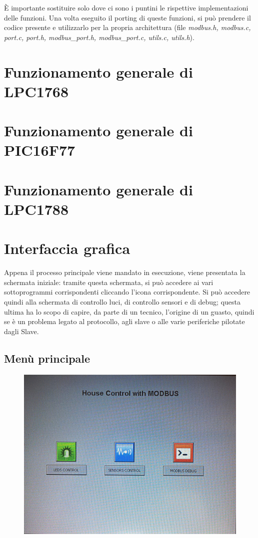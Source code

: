 \documentclass[a4paper,titlepage]{book}
\begin{document}
È importante sostituire solo dove ci sono i puntini le rispettive implementazioni delle funzioni. Una volta eseguito il porting di queste funzioni, si può prendere il codice presente e utilizzarlo per la propria architettura (file \textit{modbus.h, modbus.c, port.c, port.h, modbus\_port.h, modbus\_port.c, utils.c, utils.h}).


\section{Funzionamento generale di LPC1768}


\section{Funzionamento generale di PIC16F77}


\section{Funzionamento generale di LPC1788}

\section{Interfaccia grafica}

Appena il processo principale viene mandato in esecuzione, viene presentata la schermata iniziale: tramite questa schermata, si può accedere ai vari sottoprogrammi corrispondenti cliccando l'icona corrispondente. Si può accedere quindi alla schermata di controllo luci, di controllo sensori e di debug; questa ultima ha lo scopo di capire, da parte di un tecnico, l'origine di un guasto, quindi se è un problema legato al protocollo, agli slave o alle varie periferiche pilotate dagli Slave. 

\subsection{Menù principale}

\begin{figure}[!h]
\centering
\includegraphics[scale=0.1]{menu.jpg}
\end{figure}
\end{document}
